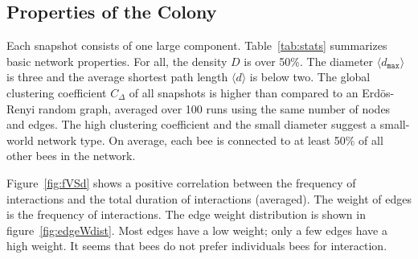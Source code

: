 \subsection{Properties of the Colony}
Each snapshot consists of one large component.
Table~\ref{tab:stats} summarizes basic network properties.
For all, the density $D$ is over 50\%.
The diameter $\langle d_{\texttt{max}} \rangle$ is three and the average shortest path length $\langle d \rangle$ is below two.
The global clustering coefficient $C_\Delta$ of all snapshots is higher than compared to an Erdös-Renyi random graph, averaged over 100 runs using the same number of nodes and edges.
The high clustering coefficient and the small diameter suggest a small-world network type.
On average, each bee is connected to at least 50\% of all other bees in the network.

Figure~\ref{fig:fVSd} shows a positive correlation between the frequency of interactions and the total duration of interactions (averaged).
 The weight of edges is the frequency of interactions.
The edge weight distribution is shown in figure~\ref{fig:edgeWdist}.
Most edges have a low weight; only a few edges have a high weight.
It seems that bees do not prefer individuals bees for interaction.



